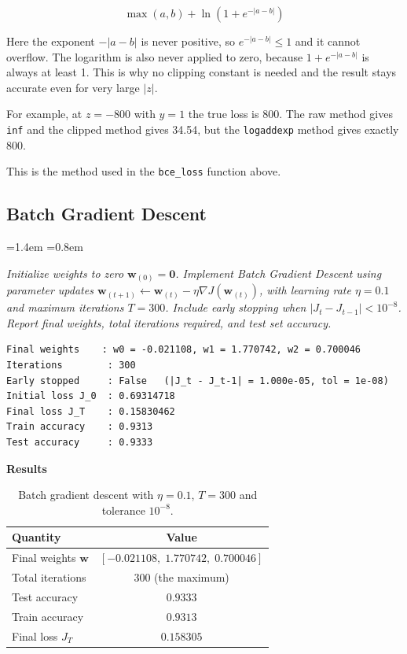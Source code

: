 \documentclass[12pt,a4paper]{article}
\newcommand{\qtext}[1]{%
  \begin{list}{}{\leftmargin=1.4em \rightmargin=0.8em
                 \topsep=3pt \parsep=0pt \itemsep=0pt}
  \item[]\itshape #1
  \end{list}}
\begin{document}
\begin{equation}
\max(a,b) + \ln\left(1+e^{-|a-b|}\right)
\label{eq:lseidentity}
\end{equation}

Here the exponent $-|a-b|$ is never positive, so $e^{-|a-b|} \le 1$ and it cannot overflow. The
logarithm is also never applied to zero, because $1+e^{-|a-b|}$ is always at least 1. This is why
no clipping constant is needed and the result stays accurate even for very large $|z|$.

For example, at $z=-800$ with $y=1$ the true loss is 800. The raw method gives \texttt{inf} and
the clipped method gives 34.54, but the \texttt{logaddexp} method gives exactly 800.

This is the method used in the \texttt{bce\_loss} function above.

\subsection{Batch Gradient Descent}

\qtext{Initialize weights to zero $\mathbf{w}_{(0)} = \mathbf{0}$. Implement Batch Gradient
Descent using parameter updates
$\mathbf{w}_{(t+1)} \leftarrow \mathbf{w}_{(t)} - \eta \nabla J(\mathbf{w}_{(t)})$, with learning
rate $\eta = 0.1$ and maximum iterations $T = 300$. Include early stopping when
$|J_t - J_{t-1}| < 10^{-8}$. Report final weights, total iterations required, and test set
accuracy.}





\begin{lstlisting}[style=plainout]
Final weights    : w0 = -0.021108, w1 = 1.770742, w2 = 0.700046
Iterations        : 300
Early stopped     : False   (|J_t - J_t-1| = 1.000e-05, tol = 1e-08)
Initial loss J_0  : 0.69314718
Final loss J_T    : 0.15830462
Train accuracy    : 0.9313
Test accuracy     : 0.9333
\end{lstlisting}

\textbf{Results}

\begin{table}[H]
\centering
\caption{Batch gradient descent with $\eta = 0.1$, $T = 300$ and tolerance $10^{-8}$.}
\label{tab:bgd}
\begin{tabular}{lc}
\toprule
\textbf{Quantity} & \textbf{Value} \\
\midrule
Final weights $\mathbf{w}$ & $[-0.021108,\; 1.770742,\; 0.700046]$ \\
Total iterations           & $300$ (the maximum) \\
Test accuracy              & $0.9333$ \\
Train accuracy             & $0.9313$ \\
Final loss $J_T$           & $0.158305$ \\
\bottomrule
\end{tabular}
\end{table}
\end{document}
